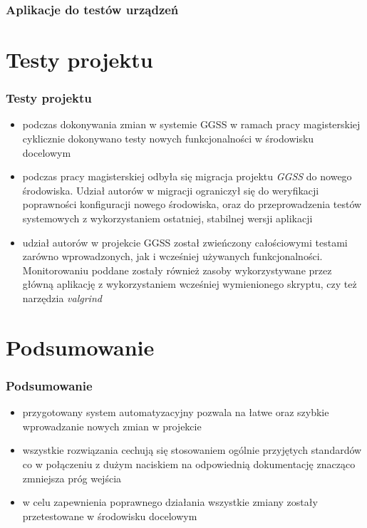 \documentclass[10pt]{beamer}
\begin{document}
\begin{frame}
    \frametitle{Aplikacje do testów urządzeń}
    
\end{frame}

\section{Testy projektu}

\begin{frame}
\frametitle{Testy projektu}
    \begin{itemize}
        \item podczas dokonywania zmian w systemie GGSS w ramach pracy magisterskiej cyklicznie dokonywano testy nowych funkcjonalności w środowisku docelowym
        \item podczas pracy magisterskiej odbyła się migracja projektu \emph{GGSS} do nowego środowiska. Udział autorów w migracji ograniczył się do weryfikacji poprawności konfiguracji nowego środowiska, oraz do przeprowadzenia testów systemowych z wykorzystaniem ostatniej, stabilnej wersji aplikacji
        \item udział autorów w projekcie GGSS został zwieńczony całościowymi testami zarówno wprowadzonych, jak i wcześniej używanych funkcjonalności. Monitorowaniu poddane zostały  również zasoby wykorzystywane przez główną aplikację z wykorzystaniem wcześniej wymienionego skryptu, czy też narzędzia \emph{valgrind}
    \end{itemize}
\end{frame}

\section{Podsumowanie}

\begin{frame}
\frametitle{Podsumowanie}
    \begin{itemize}
        \item przygotowany system automatyzacyjny pozwala na łatwe oraz szybkie wprowadzanie nowych zmian w projekcie
        \item wszystkie rozwiązania cechują się stosowaniem ogólnie przyjętych standardów co w połączeniu z dużym naciskiem na odpowiednią dokumentację znacząco zmniejsza próg wejścia
        \item w celu zapewnienia poprawnego działania wszystkie zmiany zostały przetestowane w środowisku docelowym
    \end{itemize}
\end{frame}
\end{document}
